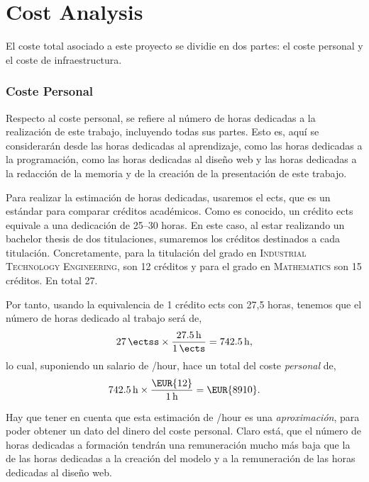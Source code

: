 \section{Cost Analysis}\label{sec:cost}

El coste total asociado a este proyecto se dividie en dos partes: el coste
personal y el coste de infraestructura.

\subsubsection{Coste Personal}

Respecto al coste personal, se refiere al número de horas dedicadas a la
realización de este trabajo, incluyendo todas sus partes. Esto es, aquí se
considerarán desde las horas dedicadas al aprendizaje, como las horas dedicadas
a la programación, como las horas dedicadas al diseño web y las horas dedicadas
a la redacción de la memoria y de la creación de la presentación de este
trabajo.

Para realizar la estimación de horas dedicadas, usaremos el \gls{ects}, que es
un estándar para comparar créditos académicos. Como es conocido, un crédito
\gls{ects} equivale a una dedicación de 25--30 horas. En este caso, al estar
realizando un bachelor thesis de dos titulaciones, sumaremos los créditos
destinados a cada titulación. Concretamente, para la titulación del grado en
\textsc{Industrial Technology Engineering}, son 12 créditos y para el grado en
\textsc{Mathematics} son 15 créditos. En total \SI{27}{\ectss}.

Por tanto, usando la equivalencia de 1 crédito \gls{ects} con 27,5 horas,
tenemos que el número de horas dedicado al trabajo será de,
\begin{equation}
  \SI{27}{\ectss} \times \frac{\SI{27.5}{\hour}}{\SI{1}{\ects}} =
  \SI{742.5}{\hour},
\end{equation}
lo cual, suponiendo un salario de /hour, hace un total del coste
\emph{personal} de,
\begin{equation}
  \SI{742.5}{\hour} \times \frac{\text{\EUR{12}}}{\SI{1}{\hour}} =
  \text{\EUR{\num{8910}}}.
\end{equation}

\begin{remarkBox}
  Hay que tener en cuenta que esta estimación de /hour es una
  \emph{aproximación}, para poder obtener un dato del dinero del coste
  personal. Claro está, que el número de horas dedicadas a formación tendrán
  una remuneración mucho más baja que la de las horas dedicadas a la creación
  del modelo y a la remuneración de las horas dedicadas al diseño web.
\end{remarkBox}

